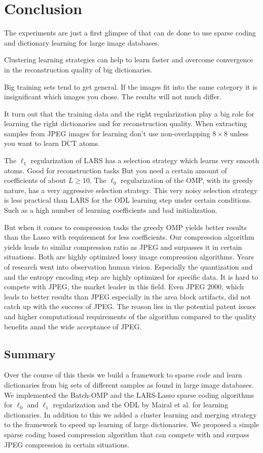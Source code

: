 \chapter{Conclusion}
The experiments are just a first glimpse of that can de done to use sparse
coding and dictionary learning for large image databases.

Clustering learning strategies can help to learn faster and overcome
convergence in the reconstruction quality of big dictionaries.

Big training sets tend to get general. If the images fit into the same category
it is insignificant which images you chose. The results will not much differ.

It turn out that the training data and the right 
regularization play a big role for learning the right dictionaries and
for reconstruction quality. When extracting samples from JPEG images for
learning don't use non-overlapping $8 \times 8$ unless you want to learn DCT
atoms. 

The $\ell_1$ regularization of LARS has a selection strategy
which learns very smooth atoms. Good for reconstruction tasks 
But you need a certain amount of coefficients of about $L \ge 10$.
The $\ell_0$ regularization of the OMP, with its greedy nature, has a very
aggressive selection strategy. 
This very noisy selection strategy is less practical
than LARS for the ODL learning step under certain conditions. Such as a high
number of learning coefficients and bad initialization.

But when it comes to compression tasks the greedy OMP yields better results
than the Lasso with requirement for less coefficients. 
Our compression algorithm yields leads to similar compression ratio as JPEG
and surpasses it in certain situations. Both are highly optimized lossy image
compression algorithms.  Years of research went into observation human vision. 
Especially the quantization and and the entropy encoding step are highly
optimized for specific data. It is hard to compete with JPEG, the market leader
in this field.  Even JPEG 2000, which leads to better results than JPEG
especially in the area block artifacts, did not catch up with the success of
JPEG.  The reason lies in the potential patent issues and higher computational
requirements of the algorithm compared to the quality benefits annd the wide
acceptance of JPEG.



\section{Summary}
Over the course of this thesis we build a framework to sparse code and learn
dictionaries from big sets of different samples as found in large image
databases. We implemented the Batch-OMP and the LARS-Lasso sparse coding
algorithms for $\ell_0$ and $\ell_1$ regularization and the ODL by Mairal et
al. for learning dictionaries. 
In addition to this we added a cluster learning and merging strategy to the
framework to speed up learning of large dictionaries.
We proposed a simple sparse coding based compression algorithm that can compete
with and surpass JPEG compression in certain situations.


